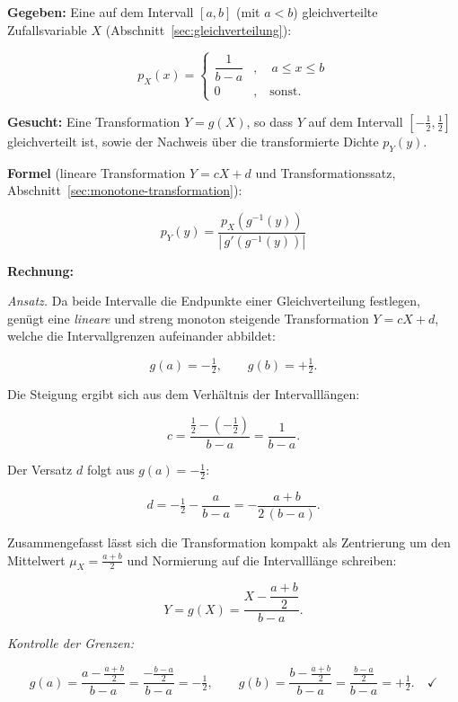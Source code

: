 \begin{beispiel}

\textbf{Gegeben:} Eine auf dem Intervall $[a, b]$ (mit $a < b$) gleichverteilte
Zufallsvariable $X$ (Abschnitt~\ref{sec:gleichverteilung}):

$$
p_X(x) = \begin{cases} \dfrac{1}{b - a} & , \quad a \leq x \leq b \\[6pt]
0 & , \quad \text{sonst.} \end{cases}
$$

\textbf{Gesucht:} Eine Transformation $Y = g(X)$, so dass $Y$ auf dem Intervall
$\left[-\tfrac{1}{2}, \tfrac{1}{2}\right]$ gleichverteilt ist, sowie der
Nachweis über die transformierte Dichte $p_Y(y)$.

\textbf{Formel} (lineare Transformation $Y = cX + d$ und Transformationssatz,
Abschnitt~\ref{sec:monotone-transformation}):

$$
p_Y(y) = \frac{p_X\!\left(g^{-1}(y)\right)}{\left|\, g'\!\left(g^{-1}(y)\right)\right|}
$$

\textbf{Rechnung:}

\emph{Ansatz.} Da beide Intervalle die Endpunkte einer Gleichverteilung
festlegen, genügt eine \emph{lineare} und streng monoton steigende
Transformation $Y = cX + d$, welche die Intervallgrenzen aufeinander abbildet:

$$
g(a) = -\tfrac{1}{2}, \qquad g(b) = +\tfrac{1}{2}.
$$

Die Steigung ergibt sich aus dem Verhältnis der Intervalllängen:

$$
c = \frac{\tfrac{1}{2} - \left(-\tfrac{1}{2}\right)}{b - a} = \frac{1}{b - a}.
$$

Der Versatz $d$ folgt aus $g(a) = -\tfrac{1}{2}$:

$$
d = -\tfrac{1}{2} - \frac{a}{b - a} = -\frac{a + b}{2\,(b - a)}.
$$

Zusammengefasst lässt sich die Transformation kompakt als Zentrierung um den
Mittelwert $\mu_X = \tfrac{a+b}{2}$ und Normierung auf die Intervalllänge
schreiben:

$$
Y = g(X) = \frac{X - \dfrac{a + b}{2}}{b - a}.
$$

\emph{Kontrolle der Grenzen:}

$$
g(a) = \frac{a - \tfrac{a+b}{2}}{b - a} = \frac{-\tfrac{b-a}{2}}{b-a} = -\tfrac{1}{2},
\qquad
g(b) = \frac{b - \tfrac{a+b}{2}}{b - a} = \frac{\tfrac{b-a}{2}}{b-a} = +\tfrac{1}{2}.
\quad\checkmark
$$


\end{beispiel}
